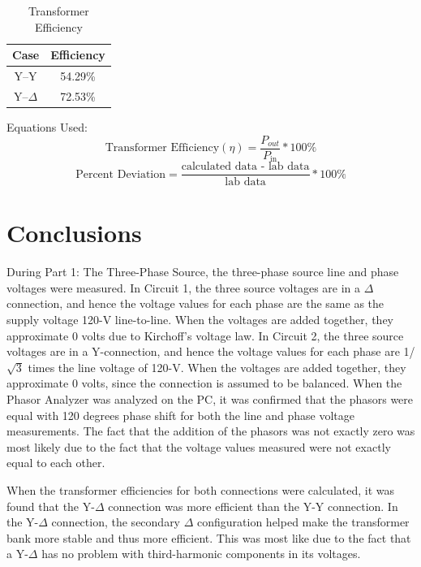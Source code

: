 \documentclass{article}
\begin{document}
\begin{table}[H]
  \centering
  \begin{tabular}{*{2}{c}}
    \textbf{Case} & \textbf{Efficiency} \\

    \hline

    Y--Y        & 54.29\% \\
    Y--$\Delta$ & 72.53\% \\
  \end{tabular}
  \caption{Transformer Efficiency}
  \label{tab:efficiency}
\end{table}



Equations Used:
\[\text{Transformer Efficiency} (\eta) = \frac{P_{out}}{P_\text{in}} * 100\% \]
\[\text{Percent Deviation} = \frac{\text{calculated data - lab data}}{\text{lab data}} * 100\%\]

\section{Conclusions} During Part 1: The Three-Phase Source, the three-phase
source line and phase voltages were measured. In Circuit 1, the three source
voltages are in a $\Delta$ connection, and hence the voltage values for each
phase are the same as the supply voltage 120-V line-to-line. When the voltages
are added together, they approximate 0 volts due to Kirchoff's voltage law. In
Circuit 2, the three source voltages are in a Y-connection, and hence the
voltage values for each phase are 1/$\sqrt{3}$ times the line voltage of 120-V.
When the voltages are added together, they approximate 0 volts, since the
connection is assumed to be balanced. When the Phasor Analyzer was analyzed on
the PC, it was confirmed that the phasors were equal with 120 degrees phase
shift for both the line and phase voltage measurements. The fact that the
addition of the phasors was not exactly zero was most likely due to the fact
that the voltage values measured were not exactly equal to each other.

When the transformer efficiencies for both connections were calculated, it was
found that the Y-$\Delta$ connection was more efficient than the Y-Y
connection. In the Y-$\Delta$ connection, the secondary $\Delta$ configuration
helped make the transformer bank more stable and thus more efficient. This was
most like due to the fact that a Y-$\Delta$ has no problem with third-harmonic
components in its voltages.
\end{document}
